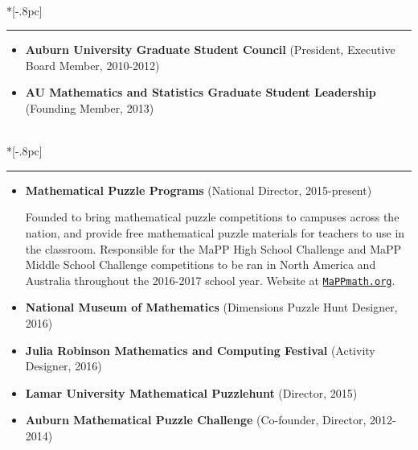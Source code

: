 \documentclass{article}
\newcommand{\headerText}[1]{
  \noindent{\large \bf #1} \\*[-.8pc]
  \rule{\textwidth}{.1pt}}
\begin{document}
\vfill
\newpage

\headerText{Service}
\begin{itemize}

  \item
    \textbf{Auburn University Graduate Student Council}
       (President, Executive Board Member, 2010-2012)
  \item
    \textbf{AU Mathematics and Statistics Graduate Student Leadership}
      (Founding Member, 2013)

\end{itemize}

\vfill


\headerText{Outreach}
\begin{itemize}

  \item
    \textbf{Mathematical Puzzle Programs} (National Director, 2015-present)


    Founded to bring mathematical puzzle competitions
    to campuses across the nation, and provide free mathematical puzzle
    materials for teachers to use in the classroom.
    Responsible for the MaPP High School
    Challenge and MaPP Middle School Challenge competitions to be ran
    in North America and Australia throughout the 2016-2017 school year.
    Website at
    \href{http://www.mappmath.org}{\nolinkurl{MaPPmath.org}}.

  \item
    \textbf{National Museum of Mathematics}
        (Dimensions Puzzle Hunt Designer, 2016)

  \item
    \textbf{Julia Robinson Mathematics and Computing Festival}
        (Activity Designer, 2016)

  \item
    \textbf{Lamar University Mathematical Puzzlehunt} (Director, 2015)


  \item
    \textbf{Auburn Mathematical Puzzle Challenge} (Co-founder, Director, 2012-2014)



\end{itemize}
\end{document}
